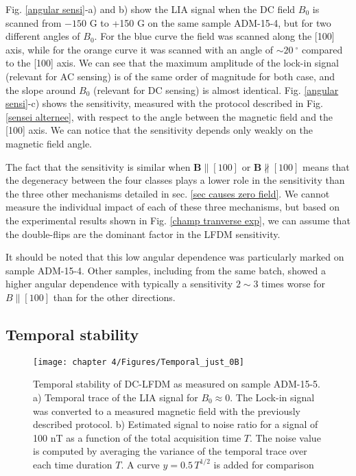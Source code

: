 \documentclass[a4paper, 11pt]{report}
\begin{document}
Fig. \ref{angular sensi}-a) and b) show the LIA signal when the DC field $B_0$ is scanned from $-150$ G to +150 G on the same sample ADM-15-4, but for two different angles of $B_0$. For the blue curve the field was scanned along the [100] axis, while for the orange curve it was scanned with an angle of $\sim 20\ ^\circ$ compared to the [100] axis. We can see that the maximum amplitude of the lock-in signal (relevant for AC sensing) is of the same order of magnitude for both case, and the slope around $B_0$ (relevant for DC sensing) is almost identical. Fig. \ref{angular sensi}-c) shows the sensitivity, measured with the protocol described in Fig. \ref{sensei alternee}, with respect to the angle between the magnetic field and the [100] axis. We can notice that the sensitivity depends only weakly on the magnetic field angle. 

The fact that the sensitivity is similar when $\mathbf{B}\parallel [100]$ or $\mathbf{B}\nparallel [100]$ means that the degeneracy between the four classes plays a lower role in the sensitivity than the three other mechanisms detailed in sec. \ref{sec causes zero field}. We cannot measure the individual impact of each of these three mechanisms, but based on the experimental results shown in Fig. \ref{champ tranverse exp}, we can assume that the double-flips are the dominant factor in the LFDM sensitivity.

It should be noted that this low angular dependence was particularly marked on sample ADM-15-4. Other samples, including from the same batch, showed a higher angular dependence with typically a sensitivity $2 \sim 3$ times worse for $B\parallel [100]$ than for the other directions.

\subsection{Temporal stability}
\begin{figure}[h!]
\centering
\texttt{[image: chapter 4/Figures/Temporal\_just\_0B]}
\caption{Temporal stability of DC-LFDM as measured on sample ADM-15-5. a) Temporal trace of the LIA signal for $B_0 \approx 0$. The Lock-in signal was converted to a measured magnetic field with the previously described protocol. b) Estimated signal to noise ratio for a signal of 100 nT as a function of the total acquisition time $T$. The noise value is computed by averaging the variance of the temporal trace over each time duration $T$. A curve $y=0.5\, T^{1/2}$ is added for comparison}
\label{temporal 0B}
\end{figure}
\end{document}
